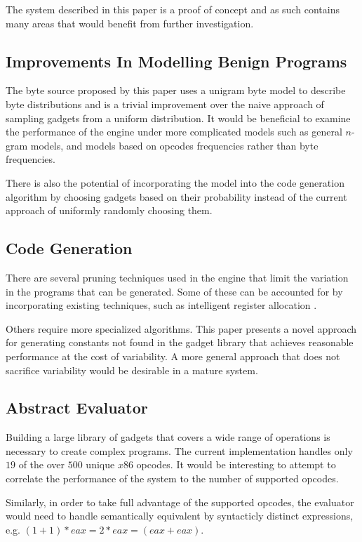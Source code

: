     The system described in this paper is a proof of concept and as such
    contains many areas that would benefit from further investigation.

    \subsection{Improvements In Modelling Benign Programs}

    The byte source proposed by this paper uses a unigram byte model to describe
    byte distributions and is a trivial improvement over the naive approach of
    sampling gadgets from a uniform distribution. It would be beneficial to
    examine the performance of the engine under more complicated models such as
    general $n$-gram models, and models based on opcodes frequencies rather than
    byte frequencies.

    There is also the potential of incorporating the model into the code
    generation algorithm by choosing gadgets based on their probability instead
    of the current approach of uniformly randomly choosing them.

    \subsection{Code Generation}

    There are several pruning techniques used in the engine that limit the
    variation in the programs that can be generated. Some of these can be
    accounted for by incorporating existing techniques, such as intelligent
    register allocation \cite{register-coloring}.

    Others require more specialized algorithms. This paper presents a novel
    approach for generating constants not found in the gadget library that
    achieves reasonable performance at the cost of variability. A more general
    approach that does not sacrifice variability would be desirable in a mature
    system.

    \subsection{Abstract Evaluator}

    Building a large library of gadgets that covers a wide range of operations
    is necessary to create complex programs. The current implementation handles
    only $19$ of the over $500$ unique $x86$ opcodes. It would be
    interesting to attempt to correlate the performance of the system to the
    number of supported opcodes.

    Similarly, in order to take full advantage of the supported opcodes, the
    evaluator would need to handle semantically equivalent by syntacticly
    distinct expressions, e.g. $(1+1)*eax = 2*eax = (eax+eax)$.

%
